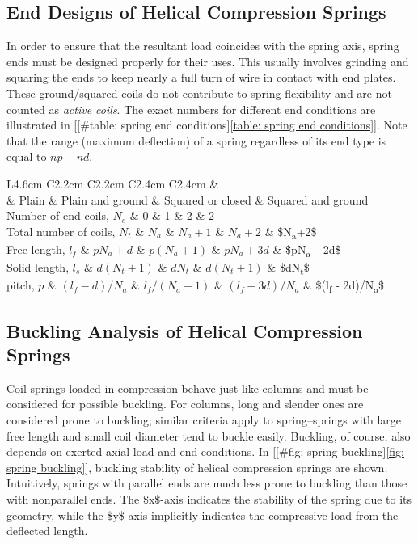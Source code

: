 \documentclass[a4paper,openany,12pt]{book}
\begin{document}
{{\subsection{End Designs of Helical Compression Springs}
\label{end-designs-of-helical-compression-springs}
In order to ensure that the resultant load coincides with the spring
axis, spring ends must be designed properly for their uses. This usually
involves grinding and squaring the ends to keep nearly a full turn of
wire in contact with end plates. These ground/squared coils do not
contribute to spring flexibility and are not counted as \emph{active coils}.
The exact numbers for different end conditions are illustrated in
[[\#table: spring end conditions]\ref{table: spring end conditions}]. Note
that the range (maximum deflection) of a spring regardless of its end
type is equal to \(np - nd\).


 L4.6cm C2.2cm C2.2cm C2.4cm C2.4cm \&\\
\& Plain \& Plain and ground \& Squared or closed \& Squared and ground\\
Number of end coils, \(N_e\) \& 0 \& 1 \& 2 \& 2\\
Total number of coils, \(N_t\) \& \(N_a\) \& \(N_a+1\) \& \(N_a+2\) \& \$N\textsubscript{a}+2\$\\
Free length, \(l_f\) \& \(pN_a+d\) \& \(p(N_a+1)\) \& \(pN_a+3d\) \& \$pN\textsubscript{a}+ 2d\$\\
Solid length, \(l_s\) \& \(d(N_t+1)\) \& \(d N_t\) \& \(d(N_t+1)\) \& \$dN\textsubscript{t}\$\\
pitch, \(p\) \& \((l_f - d)/N_a\) \& \(l_f/(N_a + 1)\) \& \((l_f - 3d)/N_a\) \&
\$(l\textsubscript{f} - 2d)/N\textsubscript{a}\$\\

\subsection{Buckling Analysis of Helical Compression Springs}
\label{buckling-analysis-of-helical-compression-springs}
Coil springs loaded in compression behave just like columns and must be
considered for possible buckling. For columns, long and slender ones are
considered prone to buckling; similar criteria apply to spring--springs
with large free length and small coil diameter tend to buckle easily.
Buckling, of course, also depends on exerted axial load and end
conditions. In [[\#fig: spring buckling]\ref{fig: spring buckling}],
buckling stability of helical compression springs are shown.
Intuitively, springs with parallel ends are much less prone to buckling
than those with nonparallel ends. The \$x\$-axis indicates the stability
of the spring due to its geometry, while the \$y\$-axis implicitly
indicates the compressive load from the deflected length.

}}
\end{document}
